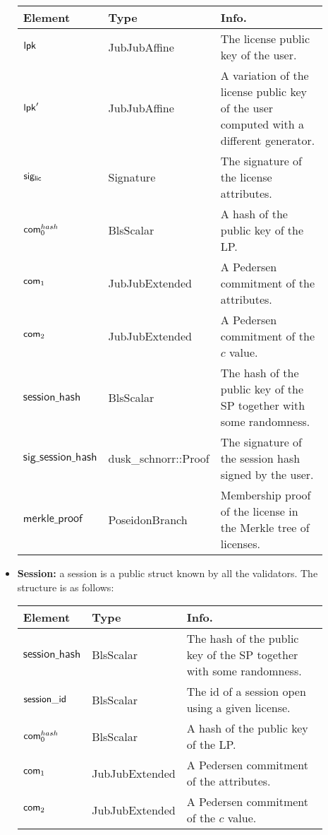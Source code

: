 \begin{itemize}
    \begin{center}
        \begin{tabular}{ | p{0.15\linewidth} | p{0.2\linewidth} | p{0.55\linewidth} | } 
        \hline
        \textbf{Element} & \textbf{Type} & \textbf{Info.} \\
        \hline
        $\mathsf{lpk}$ & JubJubAffine & The license public key of the user.\\ 
        $\mathsf{lpk}'$ & JubJubAffine & A variation of the license public key of the user computed with a different generator.\\ 
        $\mathsf{sig_{lic}}$ & Signature & The signature of the license attributes. \\ 
        $\mathsf{com}_0^{hash}$ & BlsScalar & A hash of the public key of the LP. \\ 
        $\mathsf{com}_1$ & JubJubExtended & A Pedersen commitment of the attributes. \\ 
        $\mathsf{com}_2$ & JubJubExtended & A Pedersen commitment of the $c$ value. \\ 
        $\mathsf{session\_hash}$ & BlsScalar & The hash of the public key of the SP together with some randomness. \\ 
        $\mathsf{sig\_session\_hash}$ & dusk\_schnorr::Proof & The signature of the session hash signed by the user. \\ 
        $\mathsf{merkle\_proof}$ & PoseidonBranch & Membership proof of the license in the Merkle tree of licenses. \\ 

        \hline
        \end{tabular}
    \end{center}

    \item \textbf{Session:} a session is a public struct known by all the validators. The structure is as follows:

    \begin{center}
        \begin{tabular}{ | p{0.15\linewidth} | p{0.2\linewidth} | p{0.55\linewidth} | } 
        \hline
        \textbf{Element} & \textbf{Type} & \textbf{Info.} \\
        \hline
        $\mathsf{session\_hash}$ & BlsScalar & The hash of the public key of the SP together with some randomness. \\ 
        $\mathsf{session\_id}$ & BlsScalar & The id of a session open using a given license. \\ 
        $\mathsf{com}_0^{hash}$ & BlsScalar & A hash of the public key of the LP. \\ 
        $\mathsf{com}_1$ & JubJubExtended & A Pedersen commitment of the attributes. \\ 
        $\mathsf{com}_2$ & JubJubExtended & A Pedersen commitment of the $c$ value. \\ 
        \hline
        \end{tabular}
    \end{center}


\end{itemize}
